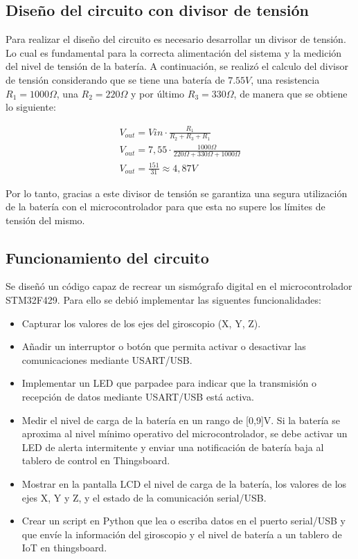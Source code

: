 \documentclass[12pt,a4paper]{article}
\begin{document}
\subsection{Diseño del circuito con divisor de tensión}
Para realizar el diseño del circuito es necesario desarrollar un divisor de tensión. Lo cual es fundamental para la correcta alimentación del sistema y la medición del nivel de tensión de la batería. A continuación, se realizó el calculo del divisor de tensión considerando que se tiene una batería de $7.55V$, una resistencia $R_1=1000\Omega$, una $R_2=220\Omega$ y por último $R_3=330\Omega$, de manera que se obtiene lo siguiente:

\begin{equation*}
\begin{split}
    V_{out}= V{in} \cdot \frac{R_1}{R_2+R_3+R_1} \\
    V_{out}=7,55 \cdot \frac{1000\Omega}{220\Omega+330\Omega+1000\Omega} \\
    V_{out}= \frac{151}{31} \approx 4,87 V
\end{split}
\end{equation*}

Por lo tanto, gracias a este divisor de tensión se garantiza una segura utilización de la batería con el microcontrolador para que esta no supere los límites de tensión del mismo. 

\subsection{Funcionamiento del circuito}
Se diseñó un código capaz de recrear  un sismógrafo digital en el microcontrolador STM32F429. Para ello se debió implementar las siguentes funcionalidades:

\begin{itemize}
    \item Capturar los valores de los ejes del giroscopio (X, Y, Z).
    \item Añadir un interruptor o botón que permita activar o desactivar las comunicaciones mediante USART/USB.
    \item Implementar un LED que parpadee para indicar que la transmisión o recepción de datos mediante USART/USB está activa.
    \item Medir el nivel de carga de la batería en un rango de [0,9]V. Si la batería se aproxima al nivel mínimo operativo del microcontrolador, se debe activar un LED de alerta intermitente y enviar una notificación de batería baja al tablero de control en Thingsboard.
    \item Mostrar en la pantalla LCD el nivel de carga de la batería, los valores de los ejes X, Y y Z, y el estado de la comunicación serial/USB.
    \item Crear un script en Python que lea o escriba datos en el puerto serial/USB y que envíe la información del giroscopio y el nivel de batería a un tablero de IoT en thingsboard.
\end{itemize}
\end{document}
